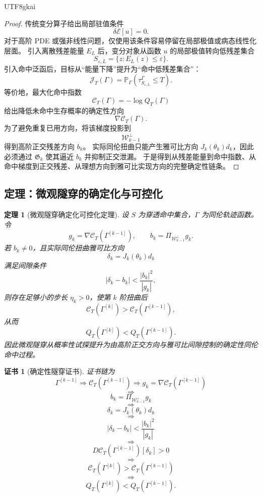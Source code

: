 \documentclass[12pt]{article}
\newtheorem{theorem}{定理}[section]
\newtheorem{Certificate}{证书}[section]
\begin{document}
\begin{CJK*}{UTF8}{gkai}
\begin{proof}
传统变分算子给出局部驻值条件
\[
  \delta\mathcal E[u]=0.
\]
对于高阶 PDE 或强非线性问题，仅使用该条件容易停留在局部极值或病态线性化层面。
引入离散残差能量 \(E_L\) 后，变分对象从函数 \(u\) 的局部极值转向低残差集合
\[
  S_{\varepsilon,L}=\{z:E_L(z)\le\varepsilon\}.
\]
引入命中泛函后，目标从“能量下降”提升为“命中低残差集合”：
\[
  \mathcal J_T(\Gamma)=\mathbb P_\Gamma(\tau_{S_{\varepsilon,L}}^\Gamma\le T).
\]
等价地，最大化命中指数
\[
  \mathcal C_T(\Gamma)=-\log Q_T(\Gamma)
\]
给出降低未命中生存概率的确定性方向
\[
  \nabla\mathcal C_T(\Gamma).
\]
为了避免重复已用方向，将该梯度投影到
\[
  \mathcal W_{k-1}^{\perp}
\]
得到高阶正交残差方向 \(b_k\)。
实际同伦扭曲只能产生雅可比方向 \(J_k(\theta_k)d_k\)，因此必须通过 \(\mathfrak G_k\) 使其逼近 \(b_k\) 并抑制正交泄漏。
于是得到从残差能量到命中指数、从命中梯度到正交残差、从理想方向到雅可比实现方向的完整确定性链条。
\end{proof}

\subsection{定理：微观隧穿的确定化与可控化}
\label{subsec:tex55-deterministic-tunneling-control-theorem}

\begin{theorem}[微观隧穿确定化可控化定理]
\label{thm:tex55-deterministic-controllable-microtunneling}
设 \(S\) 为穿透命中集合，\(\Gamma\) 为同伦轨迹函数。
令
\[
  g_k=\nabla\mathcal C_T(\Gamma^{[k-1]}),
  \qquad
  b_k=
  \Pi_{\mathcal W_{k-1}^{\perp}}g_k.
\]
若 \(b_k\neq0\)，且实际同伦扭曲雅可比方向
\[
  \delta_k=J_k(\theta_k)d_k
\]
满足间隙条件
\[
  |\delta_k-b_k|
  <
  \frac{|b_k|^2}{|g_k|},
\]
则存在足够小的步长 \(\eta_k>0\)，使第 \(k\) 阶扭曲后
\[
  \mathcal C_T(\Gamma^{[k]})
  >
  \mathcal C_T(\Gamma^{[k-1]}),
\]
从而
\[
  Q_T(\Gamma^{[k]})
  <
  Q_T(\Gamma^{[k-1]}).
\]
因此微观隧穿从概率性试探提升为由高阶正交方向与雅可比间隙控制的确定性同伦命中过程。
\end{theorem}

\begin{Certificate}[确定性隧穿证书]
\label{cert:tex55-deterministic-controllable-microtunneling}
证书链为
\[
  \Gamma^{[k-1]}
  \Longrightarrow
  \mathcal C_T(\Gamma^{[k-1]})
  \Longrightarrow
  g_k=\nabla\mathcal C_T(\Gamma^{[k-1]})
\]
\[
  \Longrightarrow
\]
\[
  b_k=\Pi_{\mathcal W_{k-1}^{\perp}}g_k
\]
\[
  \Longrightarrow
\]
\[
  \delta_k=J_k(\theta_k)d_k
\]
\[
  \Longrightarrow
\]
\[
  |\delta_k-b_k|
  <
  \frac{|b_k|^2}{|g_k|}
\]
\[
  \Longrightarrow
\]
\[
  D\mathcal C_T(\Gamma^{[k-1]})[\delta_k]>0
\]
\[
  \Longrightarrow
\]
\[
  \mathcal C_T(\Gamma^{[k]})>\mathcal C_T(\Gamma^{[k-1]})
\]
\[
  \Longrightarrow
\]
\[
  Q_T(\Gamma^{[k]})<Q_T(\Gamma^{[k-1]}).
\]
\end{Certificate}


\end{CJK*}
\end{document}
